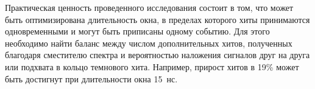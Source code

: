 Практическая ценность проведенного исследования состоит в том, что может быть оптимизирована длительность окна, в пределах которого хиты принимаются одновременными и могут быть приписаны одному событию. Для этого необходимо найти баланс между числом дополнительных хитов, полученных благодаря сместителю спектра и вероятностью наложения сигналов друг на друга или подхвата в кольцо темнового хита. Например, прирост хитов в 19\% может быть достигнут при длительности окна 15~нс.

